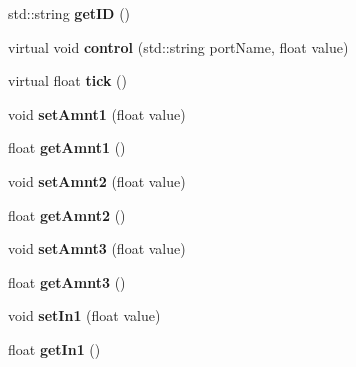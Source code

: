 \begin{DoxyCompactItemize}
\item 
std\+::string {\bfseries get\+ID} ()\hypertarget{classUGen_a500ba300703167f4daa52b51841edf24}{}\label{classUGen_a500ba300703167f4daa52b51841edf24}

\item 
virtual void {\bfseries control} (std\+::string port\+Name, float value)\hypertarget{classUGen_a456a55e23a073bc77135525be38ad0eb}{}\label{classUGen_a456a55e23a073bc77135525be38ad0eb}

\item 
virtual float {\bfseries tick} ()\hypertarget{classUGen_a7fe124a01b35094197816cb8aa033c55}{}\label{classUGen_a7fe124a01b35094197816cb8aa033c55}

\item 
void {\bfseries set\+Amnt1} (float value)\hypertarget{classUGen_a5063e6854f054cf7870abf1fdcbf8e30}{}\label{classUGen_a5063e6854f054cf7870abf1fdcbf8e30}

\item 
float {\bfseries get\+Amnt1} ()\hypertarget{classUGen_a98614bdc04b7c096fa7a75e486898947}{}\label{classUGen_a98614bdc04b7c096fa7a75e486898947}

\item 
void {\bfseries set\+Amnt2} (float value)\hypertarget{classUGen_a13494a4d13ad1fd32d16d5d22c22fb6d}{}\label{classUGen_a13494a4d13ad1fd32d16d5d22c22fb6d}

\item 
float {\bfseries get\+Amnt2} ()\hypertarget{classUGen_aa051f663b3fd0568eae2cad11b69058c}{}\label{classUGen_aa051f663b3fd0568eae2cad11b69058c}

\item 
void {\bfseries set\+Amnt3} (float value)\hypertarget{classUGen_aad0a3b7250c400216930062d651a1cf4}{}\label{classUGen_aad0a3b7250c400216930062d651a1cf4}

\item 
float {\bfseries get\+Amnt3} ()\hypertarget{classUGen_ac884f3a8cd1886698a9e2745940b9e1a}{}\label{classUGen_ac884f3a8cd1886698a9e2745940b9e1a}

\item 
void {\bfseries set\+In1} (float value)\hypertarget{classUGen_a4c68a850f5a690e39fd3903e52da313a}{}\label{classUGen_a4c68a850f5a690e39fd3903e52da313a}

\item 
float {\bfseries get\+In1} ()\hypertarget{classUGen_af1f157f807936bd22e201c9fa67ff80e}{}\label{classUGen_af1f157f807936bd22e201c9fa67ff80e}


\end{DoxyCompactItemize}
